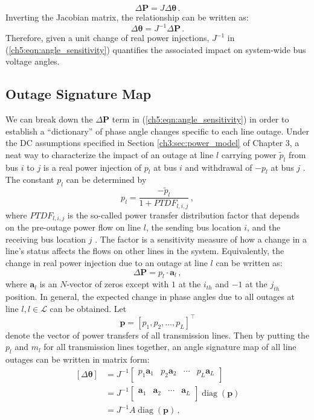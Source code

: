 $$
\Delta\textbf{P} = {J} \Delta\boldsymbol{\theta} \,.
$$
Inverting the Jacobian matrix, the relationship can be written as:
\begin{equation}
\label{ch5:eqn:angle_sensitivity}
\Delta\boldsymbol{\theta}  = {J}^{-1} \Delta\textbf{P} \,.
\end{equation}
Therefore, given a unit change of real power injections, ${J}^{-1}$ in (\ref{ch5:eqn:angle_sensitivity}) quantifies the associated impact on system-wide bus voltage angles. 

\subsection{Outage Signature Map}
\label{ch5:sec:outage_signature_map}
We can break down the $\Delta\textbf{P}$ term in (\ref{ch5:eqn:angle_sensitivity}) in order to establish a ``dictionary'' of phase angle changes specific to each line outage. Under the DC assumptions specified in Section \ref{ch3:sec:power_model} of Chapter 3, a neat way to characterize the impact of an outage at line $l$ carrying power $\tilde{p}_l$ from bus $i$ to $j$ is a real power injection of $p_{l}$ at bus $i$ and withdrawal of $-p_{l}$ at bus $j$ \cite{wood2013power}. The constant $p_l$ can be determined by
$$
p_l = \frac{-\tilde{p}_l}{1+PTDF_{l, i, j}} \,,
$$ where $PTDF_{l, i, j}$ is the so-called power transfer distribution factor that depends on the pre-outage power flow on line $l$, the sending bus location $i$, and the receiving bus location $j$ \cite{liu2004role}. The factor is a sensitivity measure of how a change in a line’s status affects the flows on other lines in the system. Equivalently, the change in real power injection due to an outage at line $l$ can be written as:
$$
\Delta \textbf{P} = p_{l} \cdot \mathbf{a}_l \,,
$$ 
where $\mathbf{a}_l$ is an $N$-vector of zeros except with $1$ at the $i_{th}$ and $-1$ at the $j_{th}$ position. In general, the expected change in phase angles due to all outages at line $l, l \in \mathcal{L}$ can be obtained. Let 
$$
\boldsymbol{p} = [p_1, p_2, \dots, p_L]^{\top}
$$
denote the vector of power transfers of all transmission lines. Then by putting the $p_{l}$ and $m_l$ for all transmission lines together, an angle signature map of all line outages can be written in matrix form:
\begin{align}
\label{ch5:eqn:complete_map}
    [\Delta\boldsymbol{\theta}] 
    &= {J}^{-1} 
    \begin{bmatrix} p_{1} \mathbf{a}_{1} & p_{2} \mathbf{a}_{2} & \cdots & p_{L} \mathbf{a}_{L}\\ 
    \end{bmatrix} \nonumber\\ 
    &= {J}^{-1} 
    \begin{bmatrix} \mathbf{a}_{1} & \mathbf{a}_{2} & \cdots & \mathbf{a}_{L} \\
    \end{bmatrix} \operatorname{ diag}(\boldsymbol{p}) \nonumber\\
    &= {J}^{-1} A \operatorname{ diag}(\boldsymbol{p}) \,, 
\end{align}
